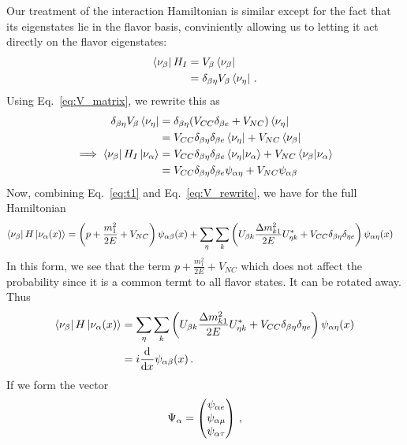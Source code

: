 Our treatment of the interaction Hamiltonian is similar except for the fact that its eigenstates lie in the flavor basis, conviniently allowing us
to letting it act directly on the flavor eigenstates:
\begin{align}
    \bra{\nu_\beta}H_I &= V_\beta \bra{\nu_\beta} \nonumber \\
                    &= \delta_{\beta\eta} V_\beta \bra{\nu_\eta}\,.
\end{align}
Using Eq.~\ref{eq:V_matrix}, we rewrite this as
\begin{align}\label{eq:V_rewrite}
    \delta_{\beta\eta} V_\beta \bra{\nu_\eta} &= \delta_{\beta\eta} (V_{CC}\delta_{\beta e} + V_{NC}) \bra{\nu_\eta} \nonumber \\
                                           &= V_{CC}\delta_{\beta\eta}\delta_{\beta e} \bra{\nu_\eta} + V_{NC}\bra{\nu_\beta} \nonumber \\
    \implies \bra{\nu_\beta}H_I\ket{\nu_\alpha}   &= V_{CC}\delta_{\beta\eta}\delta_{\beta e} \bra{\nu_\eta}\ket{\nu_\alpha} + V_{NC}\bra{\nu_\beta}\ket{\nu_\alpha} \nonumber \\
                                           &= V_{CC}\delta_{\beta\eta}\delta_{\beta e} \psi_{\alpha\eta} + V_{NC}\psi_{\alpha\beta}
\end{align}
Now, combining Eq.~\ref{eq:t1} and Eq.~\ref{eq:V_rewrite}, we have for the full Hamiltonian
\begin{align}
    \bra{\nu_\b}H\ket{\nu_\a (x)} &= \left(p + \frac{m^2_1}{2E} + V_{NC}\right) \psi_{\a\b}(x) + \sum_\eta\sum_k \left(U_{\b k} \frac{\dm_{k1}}{2E} U^*_{\eta k} + V_{CC}\delta_{\b\eta}\delta_{\eta e} \right) \psi_{\a\eta}(x)
\end{align}
In this form, we see that the term $p + \frac{m^2_1}{2E} + V_{NC}$  which does not affect the probability since it is a common termt to all flavor states. It can be rotated away.
Thus
\begin{align}\label{eq:components}
    \bra{\nu_\b}H\ket{\nu_\a (x)} &= \sum_\eta\sum_k \left(U_{\b k} \frac{\dm_{k1}}{2E} U^*_{\eta k} + V_{CC}\delta_{\b\eta}\delta_{\eta e}\right) \psi_{\a\eta}(x) \nonumber \\
                                  &= i \dv{}{x}\psi_{\a\b}(x)\,.
\end{align}
If we form the vector 
\begin{align}
    \Psi_\alpha = \begin{pmatrix}
        \psi_{\alpha e} \\
        \psi_{\alpha \mu} \\
        \psi_{\alpha \tau}
    \end{pmatrix}\,,
\end{align}
